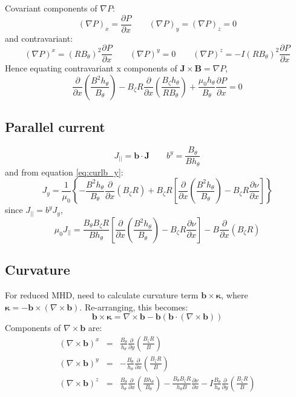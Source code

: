 \documentclass[12pt]{article}
\newcommand{\deriv}[2]{\ensuremath{\frac{\partial #1}{\partial #2}}}
\newcommand{\hthe}{\ensuremath{h_\theta}}
\newcommand{\Bp}{\ensuremath{B_\theta}}
\newcommand{\Bt}{\ensuremath{B_\zeta}}
\newcommand{\Vec}[1]{\ensuremath{\mathbf{#1}}}
\newcommand{\Bvec}{\Vec{B}}
\newcommand{\Jvec}{\Vec{J}}
\newcommand{\rbp}{\ensuremath{R\Bp}}
\newcommand{\rbpsq}{\ensuremath{\left(\rbp\right)^2}}
\begin{document}
Covariant components of $\nabla P$:
\[
\left(\nabla P\right)_x = \deriv{P}{x} \qquad \left(\nabla P\right)_y = \left(\nabla P\right)_z = 0
\]
and contravariant:
\[
\left(\nabla P\right)^x = \rbpsq\deriv{P}{x} \qquad \left(\nabla P\right)^y = 0 \qquad \left(\nabla P\right)^z = -I\rbpsq\deriv{P}{x}
\]
Hence equating contravariant x components of $\Jvec\times\Bvec = \nabla P$,
\begin{equation}
\deriv{}{x}\left(\frac{B^2\hthe}{\Bp}\right) - \Bt R\deriv{}{x}\left(\frac{\Bt\hthe}{R\Bp}\right) + \frac{\mu_0\hthe}{\Bp}\deriv{P}{x} = 0
\label{eq:xbalance}
\end{equation}

\subsection{Parallel current}

\[
J_{||} = \mathbf{b}\cdot\Jvec \qquad b^y = \frac{\Bp}{B\hthe}
\]
and from equation \ref{eq:curlb_y}:
\[
J_y = \frac{1}{\mu_0}\left\{-\frac{B^2\hthe}{\Bp}\deriv{}{x}\left(\Bt R\right) + \Bt R\left[\deriv{}{x}\left(\frac{B^2\hthe}{\Bp}\right) - \Bt R\deriv{\nu}{x}\right]\right\}
\]
since $J_{||} = b^yJ_y$,
\[
\mu_0 J_{||} =\frac{\Bp\Bt R}{B\hthe}\left[\deriv{}{x}\left(\frac{B^2\hthe}{\Bp}\right) - \Bt R\deriv{\nu}{x}\right] - B\deriv{}{x}\left(\Bt R\right)
\]

\subsection{Curvature}

For reduced MHD, need to calculate curvature term $\mathbf{b}\times\mathbf{\kappa}$, where
$\mathbf{\kappa} = -\mathbf{b}\times\left(\nabla\times\mathbf{b}\right)$. Re-arranging, this becomes:
\[
\mathbf{b}\times\mathbf{\kappa} = \nabla\times\mathbf{b} - \mathbf{b}\left(\mathbf{b}\cdot\left(\nabla\times\mathbf{b}\right)\right)
\]
Components of $\nabla\times\mathbf{b}$ are:
\begin{eqnarray*}
\left(\nabla\times\mathbf{b}\right)^x &=& \frac{\Bp}{\hthe}\deriv{}{y}\left(\frac{\Bt R}{B}\right) \\
\left(\nabla\times\mathbf{b}\right)^y &=& -\frac{\Bp}{\hthe}\deriv{}{x}\left(\frac{\Bt R}{B}\right) \\
\left(\nabla\times\mathbf{b}\right)^z &=& \frac{\Bp}{\hthe}\deriv{}{x}\left(\frac{B\hthe}{\Bp}\right) - \frac{\Bp\Bt R}{\hthe B}\deriv{\nu}{x} - I\frac{\Bp}{\hthe}\deriv{}{y}\left(\frac{\Bt R}{B}\right) \\
\end{eqnarray*}
\end{document}
